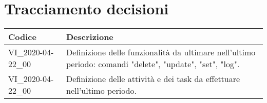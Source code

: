 \section{Tracciamento decisioni}
\renewcommand{\arraystretch}{1.8}

\begin{longtable}{|p{5cm}|p{8cm}|}
	\hline
	
	\rowcolor{header}
	\textbf{Codice} &  \textbf{Descrizione}\\
	
	\hline
	
	VI\_2020-04-22\_00 & Definizione delle funzionalità da ultimare nell'ultimo periodo: comandi "delete", "update", "set", "log".\\
	VI\_2020-04-22\_00 & Definizione delle attività e dei task da effettuare nell'ultimo periodo.\\
	\hline
\end{longtable}